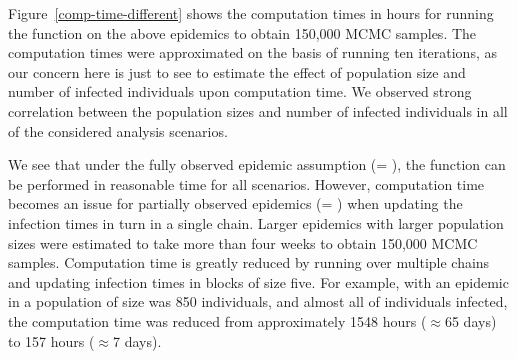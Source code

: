 \documentclass[nojss,shortnames]{jss}
\begin{document}
Figure~\ref{comp-time-different} shows the computation times in hours for running the  function on the above epidemics to obtain 150,000 MCMC samples. The computation times were approximated on the basis of running ten iterations, as our concern here is just to see to estimate the effect of population size and number of infected individuals upon computation time. We observed strong correlation between the population sizes and number of infected individuals in all of the considered analysis scenarios. 

We see that under the fully observed epidemic assumption (= ), the function  can be performed in reasonable time for all scenarios. However, computation time becomes an issue for partially observed epidemics (= ) when updating the infection times in turn in a single chain. Larger epidemics with larger population sizes were estimated to take more than four weeks to obtain 150,000 MCMC samples. Computation time is greatly reduced by running  over multiple chains and updating infection times in blocks of size five. For example, with an epidemic in a population of size was 850 individuals, and almost all of individuals infected, the computation time was reduced from approximately 1548 hours ($\approx$65 days) to 157 hours ($\approx$7 days).
\end{document}
